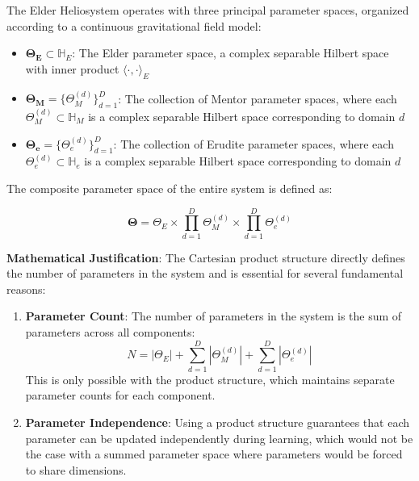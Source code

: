 \begin{definition}
The Elder Heliosystem operates with three principal parameter spaces, organized according to a continuous gravitational field model:

\begin{itemize}
    \item $\boldsymbol{\Theta_E} \subset \mathbb{H}_E$: The Elder parameter space, a complex separable Hilbert space with inner product $\langle \cdot, \cdot \rangle_E$
    
    \item $\boldsymbol{\Theta_M} = \{\Theta_M^{(d)}\}_{d=1}^D$: The collection of Mentor parameter spaces, where each $\Theta_M^{(d)} \subset \mathbb{H}_M$ is a complex separable Hilbert space corresponding to domain $d$
    
    \item $\boldsymbol{\Theta_e} = \{\Theta_e^{(d)}\}_{d=1}^D$: The collection of Erudite parameter spaces, where each $\Theta_e^{(d)} \subset \mathbb{H}_e$ is a complex separable Hilbert space corresponding to domain $d$
\end{itemize}

The composite parameter space of the entire system is defined as:

\begin{equation}
\boldsymbol{\Theta} = \Theta_E \times \prod_{d=1}^D \Theta_M^{(d)} \times \prod_{d=1}^D \Theta_e^{(d)}
\end{equation}

\textbf{Mathematical Justification}: The Cartesian product structure directly defines the number of parameters in the system and is essential for several fundamental reasons:
\begin{enumerate}
    \item \textbf{Parameter Count}: The number of parameters in the system is the sum of parameters across all components:
    \begin{equation}
    N = |\Theta_E| + \sum_{d=1}^D |\Theta_M^{(d)}| + \sum_{d=1}^D |\Theta_e^{(d)}|
    \end{equation}
    This is only possible with the product structure, which maintains separate parameter counts for each component.
    
    \item \textbf{Parameter Independence}: Using a product structure guarantees that each parameter can be updated independently during learning, which would not be the case with a summed parameter space where parameters would be forced to share dimensions.
    

\end{enumerate}
\end{definition}
